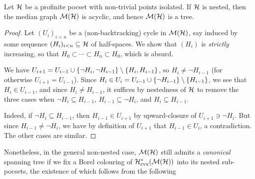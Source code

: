 \documentclass[reqno]{amsart}
\begin{document}
    \begin{corollary}\label{cor:nested_implies_tree}
        Let $\mathcal{H}$ be a profinite pocset with non-trivial points isolated. If $\mathcal{H}$ is nested, then the median graph $\mathcal{M}(\mathcal{H})$ is acyclic, and hence $\mathcal{M}(\mathcal{H})$ is a tree.
    \end{corollary}
    \begin{proof}
        Let $(U_i)_{i<n}$ be a (non-backtracking) cycle in $\mathcal{M}(\mathcal{H})$, say induced by some sequence $(H_i)_{i<n}\subseteq\mathcal{H}$ of half-spaces. We show that $(H_i)$ is \textit{strictly} increasing, so that $H_0\subset\cdots\subset H_n\subset H_0$, which is absurd.

        We have $U_{i+1}=U_{i-1}\cup\{\lnot H_i,\lnot H_{i-1}\}\setminus\left\{H_i,H_{i-1}\right\}$, so $H_i\neq\lnot H_{i-1}$ (for otherwise $U_{i+1}=U_{i-1}$). Since $H_i\in U_i=U_{i-1}\cup\{\lnot H_{i-1}\}\setminus\left\{H_{i-1}\right\}$, we see that $H_i\in U_{i-1}$, and since $H_i\neq H_{i-1}$, it suffices by nestedness of $\mathcal{H}$ to remove the three cases when $\lnot H_i\subseteq H_{i-1}$, $H_{i-1}\subseteq\lnot H_i$, and $H_i\subseteq H_{i-1}$.

        Indeed, if $\lnot H_i\subseteq H_{i-1}$, then $H_{i-1}\in U_{i+1}$ by upward-closure of $U_{i+1}\ni\lnot H_i$. But since $H_{i-1}\neq\lnot H_i$, we have by definition of $U_{i+1}$ that $H_{i-1}\in U_i$, a contradiction. The other cases are similar.
    \end{proof}

    Nonetheless, in the general non-nested case, $\mathcal{M}(\mathcal{H})$ still admits a \textit{canonical} spanning tree if we fix a Borel colouring of $\mathcal{H}_\mathrm{cvx}^\ast(\mathcal{M}(\mathcal{H}))$ into its nested sub-pocsets, the existence of which follows from the following
\end{document}
